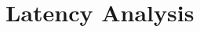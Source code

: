 \documentclass[IN,11pt,twoside,openright,idp,english]{tumthesis}
\begin{document}



\section{Latency Analysis}


\end{document}
